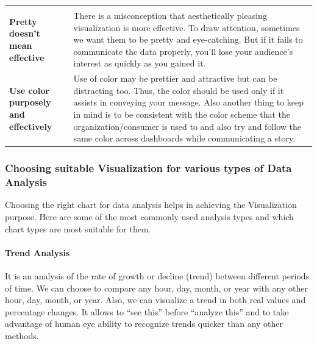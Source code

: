 \documentclass[]{book}
\let\oldparagraph\paragraph
\renewcommand{\paragraph}[1]{\oldparagraph{#1}\mbox{}}
\begin{document}
\begin{longtable}[]{@{}ll@{}}
\begin{minipage}[t]{0.75\columnwidth}
\end{minipage}\tabularnewline
\begin{minipage}[t]{0.19\columnwidth}\raggedright
\textbf{Pretty doesn't mean effective}\strut
\end{minipage} & \begin{minipage}[t]{0.75\columnwidth}\raggedright
There is a misconception that aesthetically pleasing visualization is more effective. To draw attention, sometimes we want them to be pretty and eye-catching. But if it fails to communicate the data properly, you'll lose your audience's interest as quickly as you gained it.\strut
\end{minipage}\tabularnewline
\begin{minipage}[t]{0.19\columnwidth}\raggedright
\textbf{Use color purposely and effectively}\strut
\end{minipage} & \begin{minipage}[t]{0.75\columnwidth}\raggedright
Use of color may be prettier and attractive but can be distracting too. Thus, the color should be used only if it assists in conveying your message. Also another thing to keep in mind is to be consistent with the color scheme that the organization/consumer is used to and also try and follow the same color across dashboards while communicating a story.\strut
\end{minipage}\tabularnewline
\bottomrule
\end{longtable}

\hypertarget{choosing-suitable-visualization-for-various-types-of-data-analysis}{%
\subsubsection{Choosing suitable Visualization for various types of Data Analysis}\label{choosing-suitable-visualization-for-various-types-of-data-analysis}}

Choosing the right chart for data analysis helps in achieving the Visualization purpose. Here are some of the most commonly used analysis types and which chart types are most suitable for them.

\hypertarget{trend-analysis}{%
\paragraph{Trend Analysis}\label{trend-analysis}}

It is an analysis of the rate of growth or decline (trend) between different periods of time. We can choose to compare any hour, day, month, or year with any other hour, day, month, or year. Also, we can visualize a trend in both real values and percentage changes. It allows to ``see this'' before ``analyze this'' and to take advantage of human eye ability to recognize trends quicker than any other methods.
\end{document}
